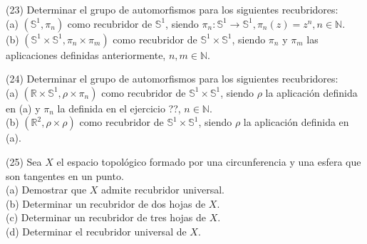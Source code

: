 \documentclass[
  a4paper,
  spanish,
  12pt,
]{scrartcl}
\begin{document}
\begin{ejer}
(23) Determinar el grupo de automorfismos para los siguientes recubridores:\\
(a) $\left(\mathbb{S}^{1}, \pi_{n}\right)$ como recubridor de $\mathbb{S}^{1}$, siendo $\pi_{n}: \mathbb{S}^{1} \rightarrow \mathbb{S}^{1}, \pi_{n}(z)=z^{n}, n \in \mathbb{N}$.\\
(b) $\left(\mathbb{S}^{1} \times \mathbb{S}^{1}, \pi_{n} \times \pi_{m}\right)$ como recubridor de $\mathbb{S}^{1} \times \mathbb{S}^{1}$, siendo $\pi_{n}$ y $\pi_{m}$ las aplicaciones definidas anteriormente, $n, m \in \mathbb{N}$.\\
\end{ejer}

\begin{ejer}
(24) Determinar el grupo de automorfismos para los siguientes recubridores:\\
(a) $\left(\mathbb{R} \times \mathbb{S}^{1}, \rho \times \pi_{n}\right)$ como recubridor de $\mathbb{S}^{1} \times \mathbb{S}^{1}$, siendo $\rho$ la aplicación definida en (a) y $\pi_{n}$ la definida en el ejercicio ??, $n \in \mathbb{N}$.\\
(b) $\left(\mathbb{R}^{2}, \rho \times \rho\right)$ como recubridor de $\mathbb{S}^{1} \times \mathbb{S}^{1}$, siendo $\rho$ la aplicación definida en (a).\\
\end{ejer}

\begin{ejer}
(25) Sea $X$ el espacio topológico formado por una circunferencia y una esfera que son tangentes en un punto.\\
(a) Demostrar que $X$ admite recubridor universal.\\
(b) Determinar un recubridor de dos hojas de $X$.\\
(c) Determinar un recubridor de tres hojas de $X$.\\
(d) Determinar el recubridor universal de $X$.
\end{ejer}
\end{document}

